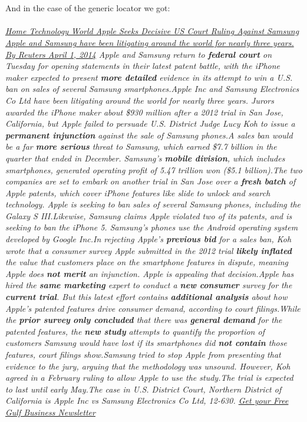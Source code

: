 \\\\
And in the case of the generic locator we got: 
\\\\
\emph{\ul{Home \/ Technology \/ World Apple Seeks Decisive US Court Ruling Against Samsung Apple and Samsung have been litigating around the world for nearly three years. By Reuters April 1, 2014} Apple and Samsung return to \textbf{federal court} on Tuesday for opening statements in their latest patent battle, with the iPhone maker expected to present \textbf{more detailed} evidence in its attempt to win a U.S. ban on sales of several Samsung smartphones.Apple Inc and Samsung Electronics Co Ltd have been litigating around the world for nearly three years. Jurors awarded the iPhone maker about \$930 million after a 2012 trial in San Jose, California, but Apple failed to persuade U.S. District Judge Lucy Koh to issue a \textbf{permanent injunction} against the sale of Samsung phones.A sales ban would be a far \textbf{more serious} threat to Samsung, which earned \$7.7 billion in the quarter that ended in December. Samsung’s \textbf{mobile division}, which includes smartphones, generated operating profit of 5.47 trillion won (\$5.1 billion).The two companies are set to embark on another trial in San Jose over a \textbf{fresh batch} of Apple patents, which cover iPhone features like slide to unlock and search technology. Apple is seeking to ban sales of several Samsung phones, including the Galaxy S III.Likewise, Samsung claims Apple violated two of its patents, and is seeking to ban the iPhone 5. Samsung’s phones use the Android operating system developed by Google Inc.In rejecting Apple’s \textbf{previous bid} for a sales ban, Koh wrote that a consumer survey Apple submitted in the 2012 trial \textbf{likely inflated} the value that customers place on the smartphone features in dispute, meaning Apple does \textbf{not merit} an injunction. Apple is appealing that decision.Apple has hired the \textbf{same marketing} expert to conduct a \textbf{new consumer} survey for the \textbf{current trial}. But this latest effort contains \textbf{additional analysis} about how Apple’s patented features drive consumer demand, according to court filings.While the \textbf{prior survey} \textbf{only concluded} that there was \textbf{general demand} for the patented features, the \textbf{new study} attempts to quantify the proportion of customers Samsung would have lost if its smartphones did \textbf{not contain} those features, court filings show.Samsung tried to stop Apple from presenting that evidence to the jury, arguing that the methodology was unsound. However, Koh agreed in a February ruling to allow Apple to use the study.The trial is expected to last until early May.The case in U.S. District Court, Northern District of California is Apple Inc vs Samsung Electronics Co Ltd, 12-630. \ul{Get your Free Gulf Business Newsletter}}

